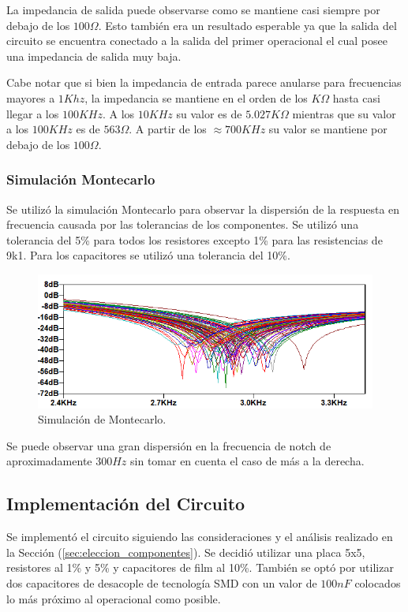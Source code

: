 La impedancia de salida puede observarse como se mantiene casi siempre por debajo de los $100\Omega$. Esto también era un resultado esperable ya que la salida del circuito se encuentra conectado a la salida del primer operacional el cual posee una impedancia de salida muy baja.

Cabe notar que si bien la impedancia de entrada parece anularse para frecuencias mayores a $1Khz$, la impedancia se mantiene en el orden de los $K\Omega$ hasta casi llegar a los $100KHz$. A los $10KHz$ su valor es de $5.027K\Omega$ mientras que su valor a los $100KHz$ es de $563\Omega$. A partir de los $\approx 700KHz$ su valor se mantiene por debajo de los $100\Omega$.

\subsubsection{Simulación Montecarlo}
\label{sec:mont}
Se utilizó la simulación Montecarlo para observar la dispersión de la respuesta en frecuencia causada por las tolerancias de los componentes. Se utilizó una tolerancia del 5\% para todos los resistores excepto 1\% para las resistencias de 9k1. Para los capacitores se utilizó una tolerancia del 10\%.

\begin{figure}[H]
	\centering
	\includegraphics[width=\textwidth]{Imagenes/Montecarlo1.PNG}
	\caption{Simulación de Montecarlo.}
	\label{fig:montecarlo}
\end{figure}

Se puede observar una gran dispersión en la frecuencia de notch de aproximadamente $300Hz$ sin tomar en cuenta el caso de más a la derecha.

\subsection{Implementación del Circuito}
Se implementó el circuito siguiendo las consideraciones y el análisis realizado en la Sección (\ref{sec:eleccion_componentes}). Se decidió utilizar una placa 5x5, resistores al 1\% y 5\% y capacitores de film al 10\%. También se optó por utilizar dos capacitores de desacople de tecnología SMD con un valor de $100nF$ colocados lo más próximo al operacional como posible. 
